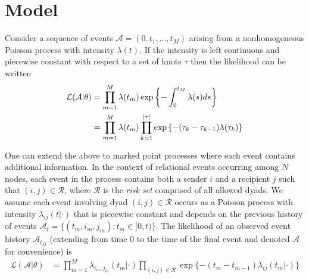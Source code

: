 \section{Model}

Consider a sequence of events $\mathcal{A} = (0,t_1, \ldots, t_M)$ arising from a nonhomogeneous Poisson process with  intensity $\lambda(t)$.
If the intensity is left continuous and piecewise constant with respect to a set of knots $\tau$ then the likelihood can be written
\begin{align}
\mathcal{L}(\mathcal{A}|\theta) &= \prod_{m=1}^M \lambda(t_m) \exp\left\{ - \int_{0}^{t_M} \lambda(s)ds \right\} \notag  \\
&= \prod_{m=1}^M \lambda(t_m) \prod_{k=1}^{|\tau|} \exp\left\{ - (\tau_{k} - \tau_{k-1}) \lambda(\tau_k) \right\}%
\end{align}

One can extend the above to marked point processes where each event contains additional information.
In the context of relational events occurring among $N$ nodes, each event in the process contains both a sender $i$ and a recipient $j$ such that  $(i,j) \in \mathcal{R}$, where $\mathcal{R}$ is the \emph{risk set} comprised of all allowed dyads.
We assume each event involving dyad $(i,j) \in \mathcal{R}$ occurs as a Poisson process with intensity $\lambda_{ij}(t|\cdot)$ that is piecewise constant and depends on the previous history of events  $\mathcal{A}_t = \{(t_m,i_m,j_m): t_m \in [0,t) \}$.  
The likelihood of an observed event history $\mathcal{A}_{t_M}$ (extending from time 0 to the time of the final event and denoted $\mathcal{A}$ for convenience) is
\begin{align}
\mathcal{L}(\mathcal{A}|\theta) &= \prod_{m=1}^M \lambda_{i_m,j_m}(t_m|\cdot) \prod_{(i,j) \in \mathcal{R}}\exp\{ - (t_m - t_{m-1}) \lambda_{ij}(t_m | \cdot) \}
\label{eqn:llk}
\end{align}

